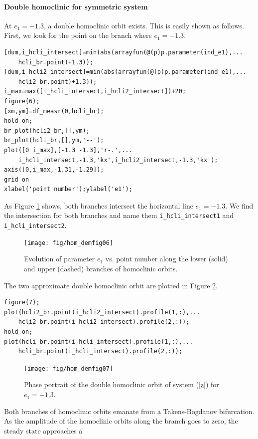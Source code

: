 \documentclass[10pt]{scrartcl}
\newcommand{\blist}[1]{\mbox{\lstinline!#1!}}
\begin{document}
{\paragraph{Double homoclinic for symmetric system}
At $e_{1}=-1.3$, a double homoclinic orbit exists.  This is easily
shown as follows. First, we look for the point on the branch where
$e_{1}=-1.3$.  
\begin{lstlisting}
[dum,i_hcli_intersect]=min(abs(arrayfun(@(p)p.parameter(ind_e1),...
    hcli_br.point)+1.3));
[dum,i_hcli2_intersect]=min(abs(arrayfun(@(p)p.parameter(ind_e1),...
    hcli2_br.point)+1.3));
i_max=max([i_hcli_intersect,i_hcli2_intersect])+20;
figure(6);
[xm,ym]=df_measr(0,hcli_br);
hold on;
br_plot(hcli2_br,[],ym);
br_plot(hcli_br,[],ym,'--');
plot([0 i_max],[-1.3 -1.3],'r-.',...
    i_hcli_intersect,-1.3,'kx',i_hcli2_intersect,-1.3,'kx');
axis([0,i_max,-1.31,-1.29]);
grid on
xlabel('point number');ylabel('e1');  
\end{lstlisting}
As Figure \ref{demo3-6} shows, both branches intersect the horizontal
line $e_1=-1.3$. We find the intersection for both branches and name
them \blist{i_hcli_intersect1} and \blist{i_hcli_intersect2}.
\begin{figure}[ht]
  \begin{center}
    \texttt{[image: fig/hom\_demfig06]}
    \caption{\label{demo3-6}Evolution of parameter $e_1$ vs. point number
      along the lower (solid) and upper (dashed) branches of homoclinic orbits.}
  \end{center}
\end{figure}
The two approximate double homoclinic orbit are plotted in Figure
\ref{demo3-7}.
\begin{lstlisting}
figure(7);
plot(hcli2_br.point(i_hcli2_intersect).profile(1,:),...
    hcli2_br.point(i_hcli2_intersect).profile(2,:));
hold on;
plot(hcli_br.point(i_hcli_intersect).profile(1,:),...
    hcli_br.point(i_hcli_intersect).profile(2,:));  
\end{lstlisting}
\begin{figure}[ht]
  \begin{center}
    \texttt{[image: fig/hom\_demfig07]}
    \caption{\label{demo3-7}Phase portrait of the double homoclinic orbit of system
      (\ref{z}) for $e_{1}=-1.3$.}
  \end{center}
\end{figure}
Both branches of homoclinic orbits emanate from a Takens-Bogdanov
bifurcation.  As the amplitude of the homoclinic orbits along the
branch goes to zero, the steady state approaches a
}
\end{document}
